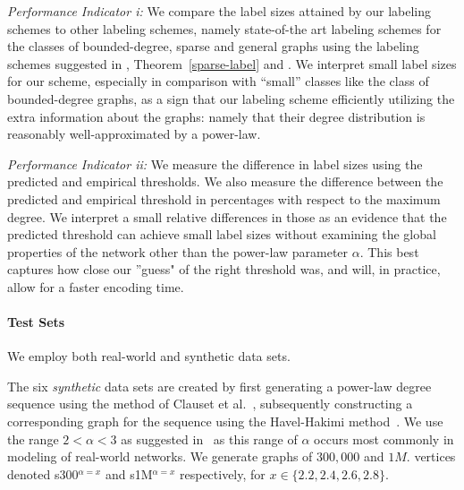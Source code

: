 \emph{Performance Indicator i:} We  compare the label sizes attained by our labeling schemes to other labeling schemes, namely state-of-the art labeling schemes for the classes of bounded-degree, sparse and general graphs using the  labeling schemes suggested in \cite{adjiashvili2014labeling},  Theorem~\ref{sparse-label} and \cite{alstrup2014adjacency}.  We interpret small label sizes for our scheme, especially in comparison with ``small'' classes like the class of bounded-degree graphs, as a sign that our labeling scheme efficiently utilizing  the extra information about the graphs: namely that their degree distribution is reasonably well-approximated by a power-law.

\emph{Performance Indicator ii:} We measure the difference in label sizes using the predicted and empirical thresholds. 
 We also measure  the difference between the predicted and empirical threshold in percentages with respect to the maximum degree.
We interpret a small relative differences in those as an evidence  that the predicted threshold can achieve small label sizes without examining the global properties of the network other than the power-law parameter $\alpha$. 
This best captures how close our ''guess" of the right threshold was, and will, in practice, allow for a faster encoding time.
 




 

\paragraph{Test Sets}
We employ both real-world and synthetic data sets. 

The six \emph{synthetic} data sets are created by first generating a power-law degree sequence using the method of Clauset et al.~\cite[App.\ D]{clauset2009power}, subsequently constructing a corresponding graph for the sequence using the Havel-Hakimi method~\cite{hakimi1962realizability}. 
We use the range $2< \alpha < 3$ as suggested in~\cite{clauset2009power} as this range of $\alpha$ occurs most commonly in modeling of real-world networks. We generate graphs of $300,000$ and $1M.$ vertices denoted  s300$^{\alpha=x}$  and s1M$^{\alpha=x}$  respectively, for $x \in \{2.2,2.4,2.6,2.8\}$. 


